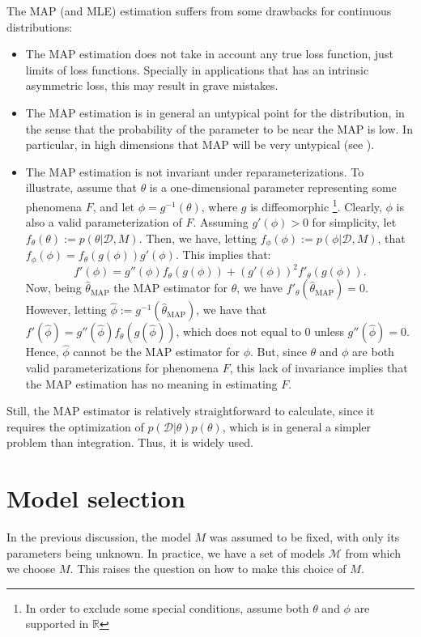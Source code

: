 The MAP (and MLE) estimation suffers from some drawbacks for continuous distributions:
\begin{itemize}
	\item The MAP estimation does not take in account any true loss function, just limits of loss functions. Specially in applications that has an intrinsic asymmetric loss, this may result in grave mistakes.
	\item The MAP estimation is in general an untypical point for the distribution, in the sense that the probability of the parameter to be near the MAP is low. In particular, in high dimensions that MAP will be very untypical (see \cite{Betancourt_2017}).
	\item The MAP estimation is not invariant under reparameterizations. To illustrate, assume that $\theta$ is a one-dimensional parameter representing some phenomena $F$, and let $\phi = g^{-1}(\theta)$, where $g$ is diffeomorphic \footnote{In order to exclude some special conditions, assume both $\theta$ and $\phi$ are supported in $\mathbb{R}$}. Clearly, $\phi$ is also a valid parameterization of $F$. Assuming $g'(\phi) > 0$ for simplicity, let $f_\theta(\theta) := p(\theta|\mathcal{D},M)$. Then, we have, letting $f_\phi(\phi) := p(\phi | \mathcal{D},M)$, that $f_\phi(\phi) = f_\theta(g(\phi))g'(\phi)$. This implies that:
	\begin{equation}
	 f'(\phi) = g''(\phi) f_\theta(g(\phi)) + (g'(\phi))^2 f'_\theta(g(\phi)).
	\end{equation}
	Now, being $\hat{\theta}_\text{MAP}$ the MAP estimator for $\theta$, we have $f'_\theta(\hat{\theta}_\text{MAP}) = 0$.
	However, letting $\hat{\phi} := g^{-1}(\hat{\theta}_\text{MAP})$, we have that $f'(\hat{\phi}) = g''(\hat{\phi}) f_\theta(g(\hat{\phi}))$, which does not equal to $0$ unless $g''(\hat{\phi}) = 0$. Hence, $\hat{\phi}$ cannot be the MAP estimator for $\phi$. But, since $\theta$ and $\phi$ are both valid parameterizations for phenomena $F$, this lack of invariance implies that the MAP estimation has no meaning in estimating $F$.
\end{itemize}
Still, the MAP estimator is relatively straightforward to calculate, since it requires the optimization of $p(\mathcal{D}|\theta) p(\theta)$, which is in general a simpler problem than integration. Thus, it is widely used.

\section{Model selection}\label{modelselectionsection}
In the previous discussion, the model $M$ was assumed to be fixed, with only its parameters being unknown. In practice, we have a set of models $\mathcal{M}$ from which we choose $M$. This raises the question on how to make this choice of $M$.

